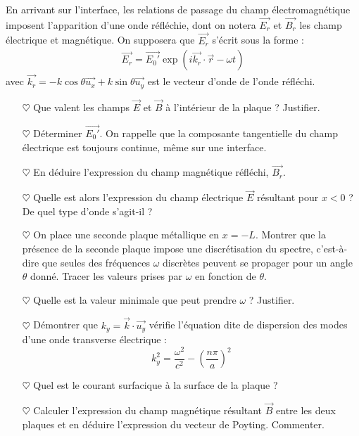 \documentclass{report}
\begin{document}
En arrivant sur l'interface, les relations de passage du champ électromagnétique imposent l'apparition d'une onde réfléchie, dont on notera $\vec{E_r}$ et $\vec{B_r}$ les champ électrique et magnétique. On supposera que $\vec{E_r}$ s'écrit sous la forme : 
\begin{align*}
	\vec{E_r}=\vec{E_0'}\exp(i\vec{k_r}\cdot\vec{r}-\omega t)
\end{align*}
avec $\vec{k_r}=-k\cos\theta\vec{u_x}+k\sin\theta\vec{u_y}$ est le vecteur d'onde de l'onde réfléchi.
\begin{itemize}
	
	\item[$\heartsuit$] Que valent les champs $\vec{E}$ et $\vec{B}$ à l'intérieur de la plaque ? Justifier.
	
	\item[$\heartsuit$] Déterminer $\vec{E_0'}$. On rappelle que la composante tangentielle du champ électrique est toujours continue, même sur une interface.
	
	\item[$\heartsuit$] En déduire l'expression du champ magnétique réfléchi, $\vec{B_r}$.
	
	\item[$\heartsuit$] Quelle est alors l'expression du champ électrique $\vec{E}$ résultant pour $x<0$ ? De quel type d'onde s'agit-il ?
	
	\item[$\heartsuit$] 	On place une seconde plaque métallique en $x=-L$. Montrer que la présence de la seconde plaque impose une discrétisation du spectre, c'est-à-dire que seules des fréquences $\omega$ discrètes peuvent se propager pour un angle $\theta$ donné. Tracer les valeurs prises par $\omega$ en fonction de $\theta$. 
	\item[$\heartsuit$] Quelle est la valeur minimale que peut prendre $\omega$ ? Justifier. 
	
	\item[$\heartsuit$] Démontrer que $k_y=\vec{k}\cdot\vec{u_y}$ vérifie l'équation dite de dispersion des modes d'une onde transverse électrique : 
	\begin{equation}
		k_y^2=\frac{\omega^2}{c^2}-\left(\frac{n\pi}{a} \right)^2 
	\end{equation}
	
	\item[$\heartsuit$] Quel est le courant surfacique à la surface de la plaque ?
	
	\item[$\heartsuit$] Calculer l'expression du champ magnétique résultant $\vec{B}$ entre les deux plaques et en déduire l'expression du vecteur de Poyting. Commenter. 
	
\end{itemize}
\end{document}
